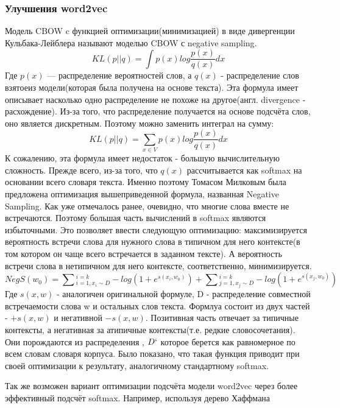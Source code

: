\subsubsection{Улучшения word2vec}
Модель CBOW c функцией оптимизации(минимизацией) в виде  дивергенции Кульбака-Лейблера называют моделью CBOW с negative sampling\cite{Book29}.
\begin{equation}
KL(p||q) = \int p(x)log\frac{p(x)}{q(x)}dx
\end{equation}
Где $p(x)$  — распределение вероятностей слов, а $q(x)$ - распределение слов взятоеиз модели(которая была получена на основе текста). Эта формула имеет описывает насколько одно распределение не похоже на другое(англ. divergence  - расхождение). Из-за того, что распределение получается на основе подсчёта слов, оно является дискретным. Поэтому  можно заменить интеграл на сумму:
\begin{equation}
KL(p||q) = \sum_{x \in V} p(x)log\frac{p(x)}{q(x)}dx
\end{equation}
К сожалению, эта формула имеет недостаток - большую вычислительную сложность. Прежде всего, из-за того, что $q(x)$ рассчитывается как softmax на основании всего словаря текста.
Именно поэтому Томасом Милковым\cite{Book29} была предложена оптимизация вышеприведенной формула, названная Negative Sampling. Как уже отмечалось ранее, очевидно, что многие слова вместе не встречаются. Поэтому большая часть вычислений в softmax являются избыточными. Это позволяет ввести следующую оптимизацию: максимизируется вероятность встречи слова для нужного слова в типичном для него контексте(в том котором он чаще всего встречается в заданном тексте). А вероятность встречи слова в нетипичном для него контексте, соответственно, минимизируется.
\begin{equation}
NegS(w_0) = \sum{_{i=1, x_i \sim D}^{i=k} -log(1 + e^{s(x_i, w_0)})}  + 
\sum{_{j=1, x_j \sim D}^{i=k} -log(1 + e^{s(x_j, w_0)})}
\end{equation}
Где $s(x,w)$ - аналогичен оригинальной формуле,  D - распределение совместной встречаемости слова w и остальных слов текста. Формлуа состоит из двух частей - $+s(x,w)$ и негативной $-s(x,w)$. Позитивная часть отвечает за типичные контексты, а негативная за атипичные контексты(т.е. редкие словосочетания).
Они порождаются из распределения , $D`$ которое берется как равномерное по всем словам словаря корпуса. Было показано, что такая функция приводит при своей оптимизации к результату, аналогичному стандартному softmax\cite{Book29}.


Так же возможен вариант  оптимизации подсчёта модели word2vec через более эффективный подсчёт softmax. Например, используя дерево Хаффмана\cite{Book30}


